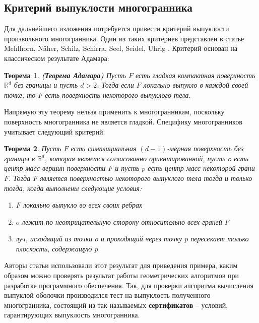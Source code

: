\documentclass[a4paper, 12pt, titlepage]{article}
\theoremstyle{definition}
\theoremstyle{plain}
\newtheorem{SmartTheorem}{Теорема}
\theoremstyle{plain}
\begin{document}
\newpage
\subsection{Критерий выпуклости многогранника}

Для дальнейшего изложения потребуется привести критерий выпуклости
произвольного многогранника. Один из таких критериев представлен в статье
Mehlhorn, Näher, Schilz, Schirra, Seel, Seidel, Uhrig
\cite{conf/compgeom/MehlhornNSSSSU96}. Критерий основан на классическом
результате Адамара:

\begin{SmartTheorem}
\textbf{(Теорема Адамара)} Пусть $\mathit{F}$ есть гладкая компактная
поверхность $\mathbb{R}^{d}$ без границы и пусть $d > 2$. Тогда если
$\mathit{F}$ локально выпукло  в каждой своей точке, то $\mathit{F}$ есть
поверхность некоторого выпуклого тела.
\end{SmartTheorem}

Напрямую эту теорему нельзя применить к многогранникам, поскольку поверхность
многогранника не является гладкой. Специфику многогранников учитывает
следующий критерий:

\begin{SmartTheorem}
Пусть $\mathit{F}$ есть симплициальная $(d - 1)$-мерная поверхность без
границы в $\mathbb{R}^{d}$, которая является согласованно ориентированной,
пусть $o$ есть центр масс вершин поверхности $\mathit{F}$ и пусть $p$ есть
центр масс некоторой грани $\mathit{F}$. Тогда $\mathit{F}$ является
поверхностью некоторого выпуклого тела тогда и только тогда, когда выполнены
следующие условия:
\begin{enumerate}
  \item $\mathit{F}$ локально выпукло во всех своих ребрах
  \item $o$ лежит по неотрицательную сторону относительно всех граней
  $\mathit{F}$
  \item луч, исходящий из точки $o$ и проходящий через точку $p$ пересекает
  только плоскость, содержащую $p$
\end{enumerate}
\end{SmartTheorem}

Авторы статьи \cite{conf/compgeom/MehlhornNSSSSU96} использовали этот
результат для приведения примера, каким образом можно проверять
результат работы геометрических алгоритмов при разработке программного
обеспечения. Так, для проверки алгоритма вычисления выпуклой оболочки
производился тест на выпуклость полученного многогранника, состоящий из так
называемых \textbf{сертификатов} -- условий, гарантирующих выпуклость
многогранника.
\end{document}

